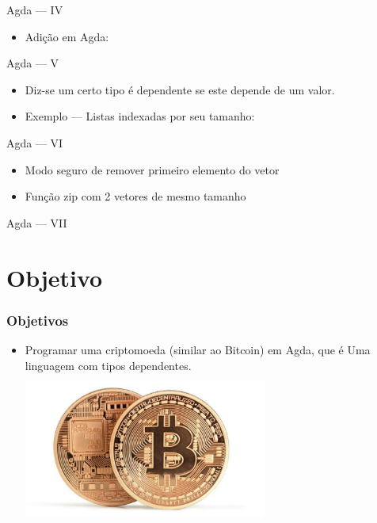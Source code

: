 \documentclass{beamer}
\begin{document}
\begin{frame}{Agda --- IV}
 \begin{itemize}
   \item Adição em Agda:
 \end{itemize}
\end{frame}

\begin{frame}{Agda --- V}
 \begin{itemize}
   \item Diz-se um certo tipo é dependente se este depende de um valor.
   \item Exemplo --- Listas indexadas por seu tamanho:
 \end{itemize}
\end{frame}

\begin{frame}{Agda --- VI}
 \begin{itemize}
   \item Modo seguro de remover primeiro elemento do vetor
   \item Função zip com 2 vetores de mesmo tamanho
 \end{itemize}
\end{frame}

\begin{frame}{Agda --- VII}
  \begin{adjustwidth}{-3.5em}{-2em} \fontsize{8}{11}
  \end{adjustwidth}
\end{frame}

 
\section{Objetivo}

 \begin{frame}
\frametitle{Objetivos}
\begin{itemize}
  \item Programar uma criptomoeda (similar ao Bitcoin) em Agda, que é Uma linguagem com tipos dependentes.
    \includegraphics[width=8cm, height=5cm]{TwoBitcoins}
\end{itemize}
\end{frame}
\end{document}

